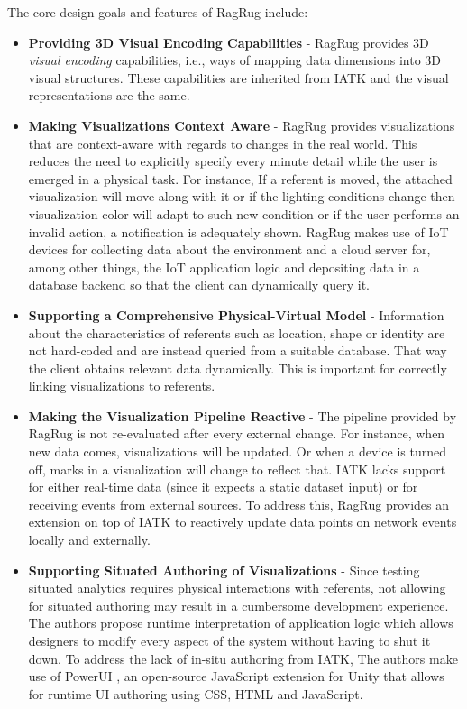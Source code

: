 \documentclass{vgtc}                          %
\begin{document}
\noindent The core design goals and features of RagRug include:
\begin{itemize}
	\item \textbf{Providing 3D Visual Encoding Capabilities} -
	      RagRug provides 3D \textit{visual encoding} capabilities, i.e.,
	      ways of mapping data dimensions into 3D visual structures. These
	      capabilities are inherited from IATK and the visual representations
	      are the same.
	\item \textbf{Making Visualizations Context Aware} -
	      RagRug provides visualizations that are context-aware with
	      regards to changes in the real world. This reduces the need to
	      explicitly specify every minute detail while the user is emerged in
	      a physical task. For instance, If a referent is moved, the attached
	      visualization will move along with it or if the lighting conditions
	      change then visualization color will adapt to such new condition
	      or if the user performs an invalid action, a notification is
	      adequately shown. RagRug makes use of IoT devices for collecting data
	      about the environment and a cloud server for, among other things, the
	      IoT application logic and depositing data in a database backend
	      so that the client can dynamically query it.
	\item \textbf{Supporting a Comprehensive Physical-Virtual Model} -
	      Information about the characteristics of referents such as location,
	      shape or identity are not hard-coded and are instead
	      queried from a suitable database. That way the client obtains
	      relevant data dynamically. This is important for correctly linking
	      visualizations to referents.
	\item \textbf{Making the Visualization Pipeline Reactive} -
	      The pipeline provided by RagRug is not re-evaluated after every external
          change. For instance, when new data comes, visualizations will be updated. Or
	      when a device is turned off, marks in a visualization will
	      change to reflect that. IATK lacks support for either real-time
	      data (since it expects a static dataset input) or for receiving
	      events from external sources. To address this, RagRug provides an
	      extension on top of IATK to reactively update data points on network
          events locally and externally.
	\item \textbf{Supporting Situated Authoring of Visualizations} -
	      Since testing situated analytics requires physical interactions with
	      referents, not allowing for situated authoring may result in a
	      cumbersome development experience. The authors propose runtime
	      interpretation of application logic which allows designers to modify
	      every aspect of the system without having to shut it down. To address
	      the lack of in-situ authoring from IATK, The authors make use of
          PowerUI \cite{powerui}, an
	      open-source JavaScript extension for Unity that allows for runtime UI
	      authoring using CSS, HTML and JavaScript.
\end{itemize}
\end{document}
